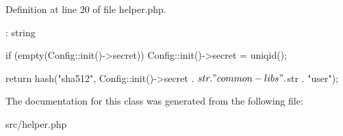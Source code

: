 \-Definition at line 20 of file helper.\-php.


\begin{DoxyCode}
                                             : string
    {
        if (empty(Config::init()->secret)) {
            Config::init()->secret = uniqid();
        }

        return hash("sha512", Config::init()->secret . $str . "common-libs" . 
      $str . "user");
    }
\end{DoxyCode}


\-The documentation for this class was generated from the following file\-:\begin{DoxyCompactItemize}
\item 
src/helper.\-php\end{DoxyCompactItemize}
